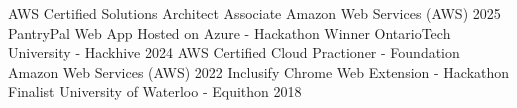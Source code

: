 

\begin{cvhonors}

  \cvhonor
  {AWS Certified Solutions Architect Associate} %
  {Amazon Web Services (AWS)} %
  {} %
  {2025} %
  \cvhonor
  {PantryPal Web App Hosted on Azure - Hackathon Winner} %
  {OntarioTech University - Hackhive} %
  {} %
  {2024} %
  \cvhonor
  {AWS Certified Cloud Practioner - Foundation} %
  {Amazon Web Services (AWS)} %
  {} %
  {2022} %
  \cvhonor
  {Inclusify Chrome Web Extension - Hackathon Finalist} %
  {University of Waterloo - Equithon} %
  {} %
  {2018} %
\end{cvhonors}
